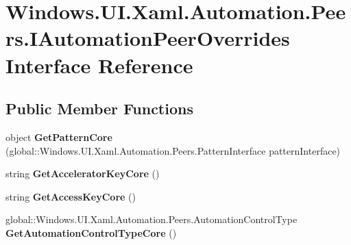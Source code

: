 \hypertarget{interface_windows_1_1_u_i_1_1_xaml_1_1_automation_1_1_peers_1_1_i_automation_peer_overrides}{}\section{Windows.\+U\+I.\+Xaml.\+Automation.\+Peers.\+I\+Automation\+Peer\+Overrides Interface Reference}
\label{interface_windows_1_1_u_i_1_1_xaml_1_1_automation_1_1_peers_1_1_i_automation_peer_overrides}
\subsection*{Public Member Functions}
\begin{DoxyCompactItemize}
\item 
\mbox{\label{interface_windows_1_1_u_i_1_1_xaml_1_1_automation_1_1_peers_1_1_i_automation_peer_overrides_a5d2d11301f1cf8aaaa68c84a06f82f23}} 
object {\bfseries Get\+Pattern\+Core} (global\+::\+Windows.\+U\+I.\+Xaml.\+Automation.\+Peers.\+Pattern\+Interface pattern\+Interface)
\item 
\mbox{\label{interface_windows_1_1_u_i_1_1_xaml_1_1_automation_1_1_peers_1_1_i_automation_peer_overrides_a413b5ceeabf488cbe8e51c6db2f1c3fe}} 
string {\bfseries Get\+Accelerator\+Key\+Core} ()
\item 
\mbox{\label{interface_windows_1_1_u_i_1_1_xaml_1_1_automation_1_1_peers_1_1_i_automation_peer_overrides_a9f256fb83255ad9ed034377ed78942de}} 
string {\bfseries Get\+Access\+Key\+Core} ()
\item 
\mbox{\label{interface_windows_1_1_u_i_1_1_xaml_1_1_automation_1_1_peers_1_1_i_automation_peer_overrides_a4b5520afe57923b9abbd09244a8e2b70}} 
global\+::\+Windows.\+U\+I.\+Xaml.\+Automation.\+Peers.\+Automation\+Control\+Type {\bfseries Get\+Automation\+Control\+Type\+Core} ()
\item 

\end{DoxyCompactItemize}
